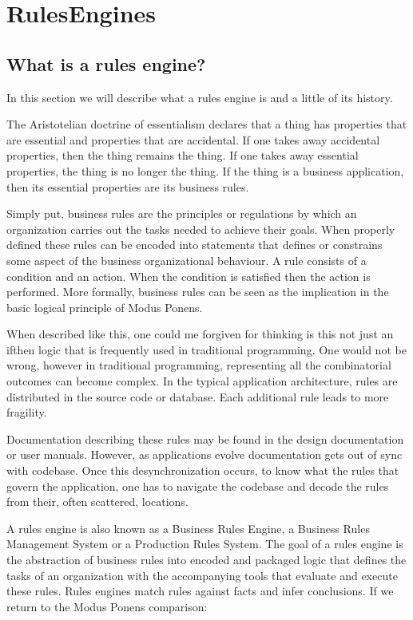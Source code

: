 \section{RulesEngines}

\subsection{What is a rules engine?}

In this section we will describe what a rules engine is and a little of its history.

The Aristotelian doctrine of essentialism declares that a thing has properties that are essential and properties that are accidental.
If one takes away accidental properties, then the thing remains the thing.
If one takes away essential properties, the thing is no longer the thing.
If the thing is a business application, then its essential properties are its business rules.


Simply put, business rules are the principles or regulations by which an organization carries out the tasks needed to achieve their goals.
When properly defined these rules can be encoded into statements that defines or constrains some aspect of the business organizational behaviour.
A rule consists of a condition and an action. 
When the condition is satisfied then the action is performed.
More formally, business rules can be seen as the implication in the basic logical principle of Modus Ponens.

When described like this, one could me forgiven for thinking is this not just an if\-then logic that is frequently used in traditional programming.
One would not be wrong, however in traditional programming, representing all the combinatorial outcomes can become complex.
In the typical application architecture, rules are distributed in the source code or database.
Each additional rule leads to more fragility.

Documentation describing these rules may be found in the design documentation or user manuals.
However, as applications evolve documentation gets out of sync with codebase.
Once this desynchronization occurs, to know what the rules that govern the application, one has to navigate the codebase and decode the rules from their, often scattered, locations.

A rules engine is also known as a Business Rules Engine, a Business Rules Management System or a Production Rules System.
The goal of a rules engine  is the abstraction of business rules into encoded and packaged logic that defines the tasks of an organization with the accompanying tools that evaluate and execute these rules.
Rules engines match rules against facts and infer conclusions. 
If we return to the Modus Ponens comparison:

